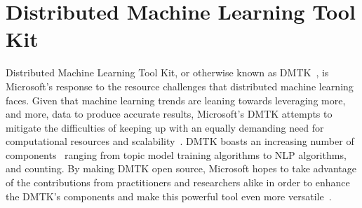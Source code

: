 \section{Distributed Machine Learning Tool Kit}

Distributed Machine Learning Tool Kit, or otherwise known as 
DMTK~\cite{hid-sp18-504-dmtk}, is Microsoft's response to the resource 
challenges that distributed machine learning faces. Given that machine 
learning trends are leaning towards leveraging more, and more, data to 
produce accurate results, Microsoft's DMTK attempts to mitigate the 
difficulties of keeping up with an equally demanding need for computational 
resources and scalability~\cite{hid-sp18-504-dmtk}. DMTK boasts an increasing 
number of components~\cite{hid-sp18-504-msresearch} ranging from topic 
model training algorithms to NLP algorithms, and counting. By making 
DMTK open source, Microsoft hopes to take advantage of the contributions 
from practitioners and researchers alike in order to enhance the DMTK's 
components and make this powerful tool even more 
versatile~\cite{hid-sp18-504-msresearch}.
